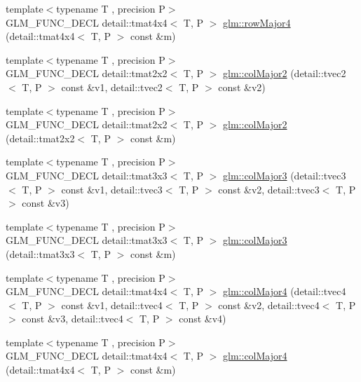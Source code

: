 \begin{DoxyCompactItemize}
\item 
{\footnotesize template$<$typename T , precision P$>$ }\\G\+L\+M\+\_\+\+F\+U\+N\+C\+\_\+\+D\+E\+CL detail\+::tmat4x4$<$ T, P $>$ \hyperlink{group__gtx__matrix__major__storage_ga1a797d9a3f0d6b81e50b4f1bef2ed281}{glm\+::row\+Major4} (detail\+::tmat4x4$<$ T, P $>$ const \&m)
\item 
{\footnotesize template$<$typename T , precision P$>$ }\\G\+L\+M\+\_\+\+F\+U\+N\+C\+\_\+\+D\+E\+CL detail\+::tmat2x2$<$ T, P $>$ \hyperlink{group__gtx__matrix__major__storage_gae53863d1ced5629d5aa3ce04abf14ab1}{glm\+::col\+Major2} (detail\+::tvec2$<$ T, P $>$ const \&v1, detail\+::tvec2$<$ T, P $>$ const \&v2)
\item 
{\footnotesize template$<$typename T , precision P$>$ }\\G\+L\+M\+\_\+\+F\+U\+N\+C\+\_\+\+D\+E\+CL detail\+::tmat2x2$<$ T, P $>$ \hyperlink{group__gtx__matrix__major__storage_ga84d93f2dea8fd341232f0505038d50f6}{glm\+::col\+Major2} (detail\+::tmat2x2$<$ T, P $>$ const \&m)
\item 
{\footnotesize template$<$typename T , precision P$>$ }\\G\+L\+M\+\_\+\+F\+U\+N\+C\+\_\+\+D\+E\+CL detail\+::tmat3x3$<$ T, P $>$ \hyperlink{group__gtx__matrix__major__storage_ga8bc9dc6fcd7017b7123a151d9f251013}{glm\+::col\+Major3} (detail\+::tvec3$<$ T, P $>$ const \&v1, detail\+::tvec3$<$ T, P $>$ const \&v2, detail\+::tvec3$<$ T, P $>$ const \&v3)
\item 
{\footnotesize template$<$typename T , precision P$>$ }\\G\+L\+M\+\_\+\+F\+U\+N\+C\+\_\+\+D\+E\+CL detail\+::tmat3x3$<$ T, P $>$ \hyperlink{group__gtx__matrix__major__storage_ga40caccd20b8afb6de68c626efc376927}{glm\+::col\+Major3} (detail\+::tmat3x3$<$ T, P $>$ const \&m)
\item 
{\footnotesize template$<$typename T , precision P$>$ }\\G\+L\+M\+\_\+\+F\+U\+N\+C\+\_\+\+D\+E\+CL detail\+::tmat4x4$<$ T, P $>$ \hyperlink{group__gtx__matrix__major__storage_ga50e127c56370410d8054be2cdef03503}{glm\+::col\+Major4} (detail\+::tvec4$<$ T, P $>$ const \&v1, detail\+::tvec4$<$ T, P $>$ const \&v2, detail\+::tvec4$<$ T, P $>$ const \&v3, detail\+::tvec4$<$ T, P $>$ const \&v4)
\item 
{\footnotesize template$<$typename T , precision P$>$ }\\G\+L\+M\+\_\+\+F\+U\+N\+C\+\_\+\+D\+E\+CL detail\+::tmat4x4$<$ T, P $>$ \hyperlink{group__gtx__matrix__major__storage_ga89086c0396205669304be98a8c601b78}{glm\+::col\+Major4} (detail\+::tmat4x4$<$ T, P $>$ const \&m)
\end{DoxyCompactItemize}


